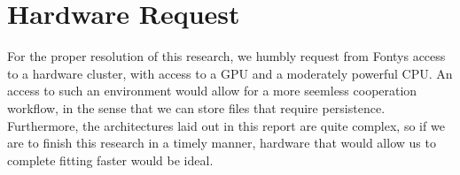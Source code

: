 \section{Hardware Request}

For the proper resolution of this research, we humbly request from Fontys access to a hardware cluster, with access to a GPU and a moderately powerful CPU. An access to such an environment would allow for a more seemless
cooperation workflow, in the sense that we can store files that require persistence. Furthermore, the architectures laid out in this report are quite complex, so if we are to finish this research in a timely manner,
hardware that would allow us to complete fitting faster would be ideal.